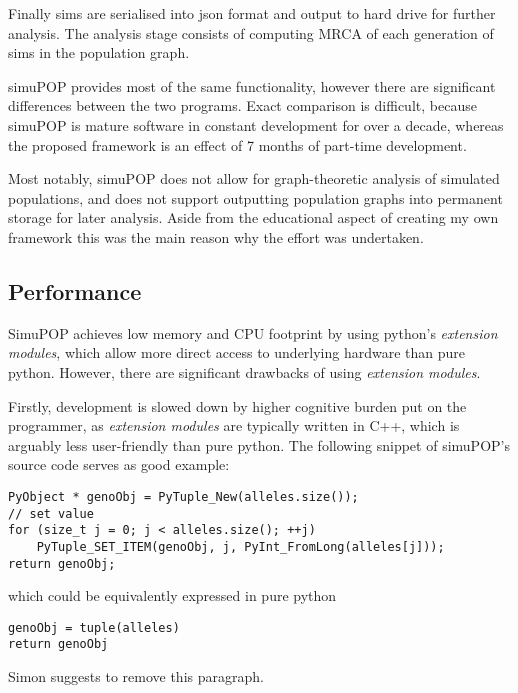 \documentclass{l4proj}
\newif\ifdebug
\begin{document}
Finally sims are serialised into json format and output to hard drive for further analysis. The analysis stage consists of computing MRCA of each generation of sims in the population graph.

simuPOP provides most of the same functionality, however there are significant differences between the two programs. Exact comparison is difficult, because simuPOP is mature software in constant development for over a decade, whereas the proposed framework is an effect of 7 months of part-time development.

Most notably, simuPOP does not allow for graph-theoretic analysis of simulated populations, and does not support outputting population graphs into permanent storage for later analysis. Aside from the educational aspect of creating my own framework this was the main reason why the effort was undertaken.

\subsection{Performance}

SimuPOP achieves low memory and CPU footprint by using python's \textit{extension modules}, which allow more direct access to underlying hardware than pure python. However, there are significant drawbacks of using \textit{extension modules}.

Firstly, development is slowed down by higher cognitive burden put on the programmer, as \textit{extension modules} are typically written in C++, which is arguably less user-friendly than pure python. The following snippet of simuPOP's source code serves as good example:

\begin{lstlisting}
PyObject * genoObj = PyTuple_New(alleles.size());
// set value
for (size_t j = 0; j < alleles.size(); ++j)
    PyTuple_SET_ITEM(genoObj, j, PyInt_FromLong(alleles[j]));
return genoObj;
\end{lstlisting}

which could be equivalently expressed in pure python 

\begin{lstlisting}
genoObj = tuple(alleles)
return genoObj    
\end{lstlisting}

\ifdebug

Simon suggests to remove this paragraph.
\end{document}
